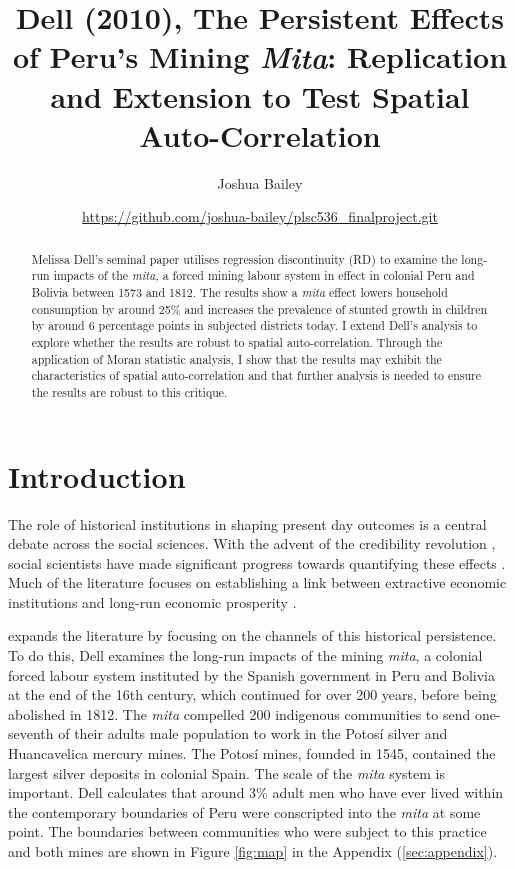\documentclass[12pt]{article}
\title{Dell (2010), The Persistent Effects of Peru's Mining \emph{Mita}: Replication and Extension to Test Spatial Auto-Correlation}
\author{Joshua Bailey
\and \small \url{https://github.com/joshua-bailey/plsc536_finalproject.git}}
\begin{document}
\maketitle

\begin{abstract}
Melissa Dell's seminal paper \autocite{Dell2010Mita} utilises regression discontinuity (RD) to examine the long-run impacts of the \emph{mita}, a forced mining labour system in effect in colonial Peru and Bolivia between 1573 and 1812. The results show a \emph{mita} effect lowers household consumption by around 25\% and increases the prevalence of stunted growth in children by around 6 percentage points in subjected districts today. I extend Dell's analysis to explore whether the results are robust to spatial auto-correlation. Through the application of Moran statistic analysis, I show that the results may exhibit the characteristics of spatial auto-correlation and that further analysis is needed to ensure the results are robust to this critique. 
\end{abstract}

\section{Introduction}

The role of historical institutions in shaping present day outcomes is a central debate across the social sciences. With the advent of the credibility revolution \autocite{Angrist2010TheEconometrics}, social scientists have made significant progress towards quantifying these effects \autocite{Acemoglu2001TheInvestigation} \autocite{Acemoglu2002ReversalDistribution} \autocite{Nunn2008TheTrades}. Much of the literature focuses on establishing a link between extractive economic institutions and long-run economic prosperity \autocite{Acemoglu2002ReversalDistribution} \autocite{Banerjee2005HistoryIndia} \autocite{Glaeser2004DoGrowth}.

\autocite{Dell2010Mita} expands the literature by focusing on the channels of this historical persistence. To do this, Dell examines the long-run impacts of the mining \emph{mita}, a colonial forced labour system instituted by the Spanish government in Peru and Bolivia at the end of the 16th century, which continued for over 200 years, before being abolished in 1812. The \emph{mita} compelled 200 indigenous communities to send one-seventh of their adults male population to work in the Potosí silver and Huancavelica mercury mines. The Potosí mines, founded in 1545, contained the largest silver deposits in colonial Spain. The scale of the \emph{mita} system is important. Dell calculates that around 3\% adult men who have ever lived within the contemporary boundaries of Peru were conscripted into the \emph{mita} at some point. The boundaries between communities who were subject to this practice and both mines are shown in Figure \ref{fig:map} in the Appendix (\ref{sec:appendix}). 
\end{document}

